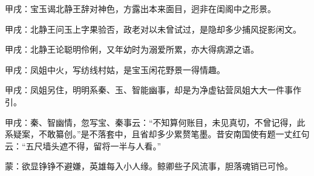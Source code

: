 \begin{parag}

    \begin{note}甲戌：宝玉谒北静王辞对神色，方露出本来面目，迥非在闺阁中之形景。\end{note}
\end{parag}


\begin{parag}


    \begin{note}甲戌：北静王问玉上字果验否，政老对以未曾试过，是隐却多少捕风捉影闲文。\end{note}
\end{parag}


\begin{parag}


    \begin{note}甲戌：北静王论聪明伶俐，又年幼时为溺爱所累，亦大得病源之语。\end{note}
\end{parag}


\begin{parag}


    \begin{note}甲戌：凤姐中火，写纺线村姑，是宝玉闲花野景一得情趣。\end{note}
\end{parag}


\begin{parag}


    \begin{note}甲戌：凤姐另住，明明系秦、玉、智能幽事，却是为净虚钻营凤姐大大一件事作引。\end{note}
\end{parag}


\begin{parag}


    \begin{note}甲戌：秦、智幽情，忽写宝、秦事云：“不知算何账目，未见真切，不曾记得，此系疑案，不敢纂创。”是不落套中，且省却多少累赘笔墨。昔安南国使有题一丈红句云：“五尺墙头遮不得，留将一半与人看。”\end{note}
\end{parag}


\begin{parag}


    \begin{note}蒙：欲显铮铮不避嫌，英雄每入小人缘。鲸卿些子风流事，胆落魂销已可怜。\end{note}
\end{parag}

